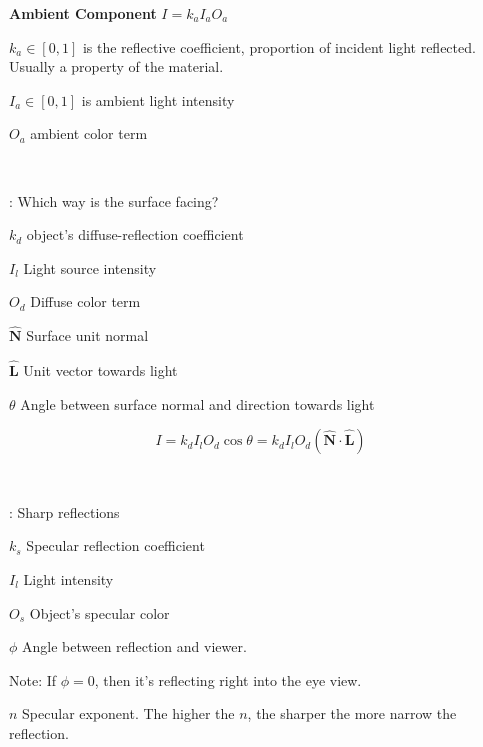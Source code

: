 \documentclass[11pt]{article}
\begin{document}
\begin{spacing}{1.2}

{\bf Ambient Component}  $I = k_a I_a O_a$

$k_a \in [0,1]$ is the reflective coefficient, proportion of incident light reflected.  Usually a property of the material.

$I_a \in [0,1]$ is ambient light intensity

$O_a$ ambient color term

\

:  Which way is the surface facing?

$k_d$ object's diffuse-reflection coefficient

$I_l$ Light source intensity

$O_d$ Diffuse color term

$\hat{\mathbf{N}}$ Surface unit normal

$\hat{\mathbf{L}}$ Unit vector towards light

$\theta$ Angle between surface normal and direction towards light

$$I = k_d I_l O_d \cos \theta = k_d I_l O_d \left( \hat{\mathbf{N}} \cdot \hat{\mathbf{L}} \right)$$

\

:  Sharp reflections

$k_s$ Specular reflection coefficient

$I_l$ Light intensity

$O_s$ Object's specular color

$\phi$ Angle between reflection and viewer.  

Note:  If $\phi = 0$, then it's reflecting right into the eye view.  

$n$ Specular exponent.  The higher the $n$, the sharper the more narrow the reflection.  


\end{spacing}
\end{document}
